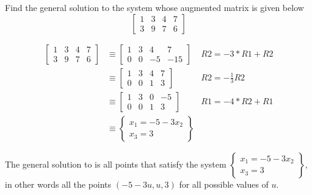 \documentclass{mathhomework}
\begin{document}
\pagebreak
\begin{problem}[1.2\#7]
    Find the general solution to the system whose augmented matrix is given below
    $$\begin{bmatrix}
        1 & 3 & 4 & 7 \\
        3 & 9 & 7 & 6
    \end{bmatrix}$$

    \begin{solution}
        \begin{align*}
            \begin{bmatrix}
                1 & 3 & 4 & 7 \\
                3 & 9 & 7 & 6
            \end{bmatrix}
            & \equiv
            \begin{bmatrix}
                1 & 3 & 4 & 7 \\
                0 & 0 & -5 & -15
            \end{bmatrix}
            & R2 = -3 * R1 + R2 \\ & \equiv
            \begin{bmatrix}
                1 & 3 & 4 & 7 \\
                0 & 0 & 1 & 3
            \end{bmatrix}
            & R2 = -\frac{1}{3} R2 \\ & \equiv
            \begin{bmatrix}
                1 & 3 & 0 & -5 \\
                0 & 0 & 1 & 3
            \end{bmatrix}
            & R1 = -4 * R2 + R1 \\ & \equiv
            \begin{Bmatrix}
                x_1 = -5 - 3x_2 \\
                x_3 = 3
            \end{Bmatrix}
        \end{align*}

        The general solution to is all points that satisfy the system $\begin{Bmatrix}
            x_1 = -5 - 3x_2 \\
            x_3 = 3
        \end{Bmatrix}$, in other words all the points $(-5 - 3u, u, 3)$ for all possible values of $u$.
    \end{solution}
\end{problem}
\end{document}
